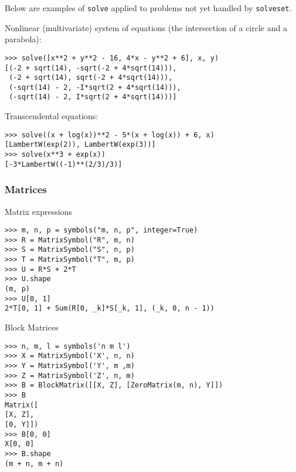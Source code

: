 Below are examples of \texttt{solve} applied to problems not yet handled by \texttt{solveset}.

\noindent Nonlinear (multivariate) system of equations (the intersection of a circle
and a parabola):
\begin{verbatim}
>>> solve([x**2 + y**2 - 16, 4*x - y**2 + 6], x, y)
[(-2 + sqrt(14), -sqrt(-2 + 4*sqrt(14))),
 (-2 + sqrt(14), sqrt(-2 + 4*sqrt(14))),
 (-sqrt(14) - 2, -I*sqrt(2 + 4*sqrt(14))),
 (-sqrt(14) - 2, I*sqrt(2 + 4*sqrt(14)))]
\end{verbatim}

\noindent Transcendental equations:
\begin{verbatim}
>>> solve((x + log(x))**2 - 5*(x + log(x)) + 6, x)
[LambertW(exp(2)), LambertW(exp(3))]
>>> solve(x**3 + exp(x))
[-3*LambertW((-1)**(2/3)/3)]
\end{verbatim}

\subsubsection{Matrices}

\noindent Matrix expressions
\begin{verbatim}
>>> m, n, p = symbols("m, n, p", integer=True)
>>> R = MatrixSymbol("R", m, n)
>>> S = MatrixSymbol("S", n, p)
>>> T = MatrixSymbol("T", m, p)
>>> U = R*S + 2*T
>>> U.shape
(m, p)
>>> U[0, 1]
2*T[0, 1] + Sum(R[0, _k]*S[_k, 1], (_k, 0, n - 1))
\end{verbatim}

\noindent Block Matrices
\begin{verbatim}
>>> n, m, l = symbols('n m l')
>>> X = MatrixSymbol('X', n, n)
>>> Y = MatrixSymbol('Y', m ,m)
>>> Z = MatrixSymbol('Z', n, m)
>>> B = BlockMatrix([[X, Z], [ZeroMatrix(m, n), Y]])
>>> B
Matrix([
[X, Z],
[0, Y]])
>>> B[0, 0]
X[0, 0]
>>> B.shape
(m + n, m + n)
\end{verbatim}
